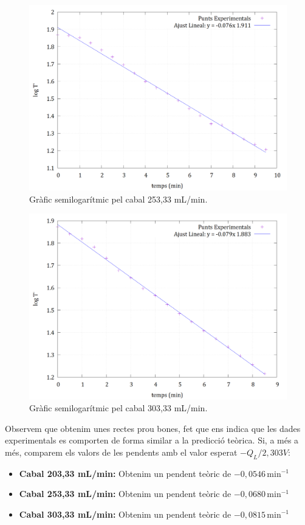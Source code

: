 \documentclass[10pt, twoside]{article}
\begin{document}
\begin{figure}[H]
    \centering
    \includegraphics[width=0.7\linewidth]{ajustsemilog253.png}
    \caption{Gràfic semilogarítmic pel cabal 253,33 mL/min.}
    \label{fig3}
\end{figure}

\begin{figure}[H]
    \centering
    \includegraphics[width=0.7\linewidth]{ajustsemilog303.png}
    \caption{Gràfic semilogarítmic pel cabal 303,33 mL/min.}
    \label{fig4}
\end{figure}

Observem que obtenim unes rectes prou bones, fet que ens indica que les dades experimentals es comporten de forma similar a la predicció teòrica. Si, a més a més, comparem els valors de les pendents amb el valor esperat ${-Q_L}/{2,303V}$:

\begin{itemize}
    \item \textbf{Cabal 203,33 mL/min:} Obtenim un pendent teòric de \( -0,0546 \, \text{min}^{-1} \)
    \item \textbf{Cabal 253,33 mL/min:} Obtenim un pendent teòric de \( -0,0680 \, \text{min}^{-1} \)
    \item \textbf{Cabal 303,33 mL/min:} Obtenim un pendent teòric de \( -0,0815 \, \text{min}^{-1} \)
\end{itemize}
\end{document}
